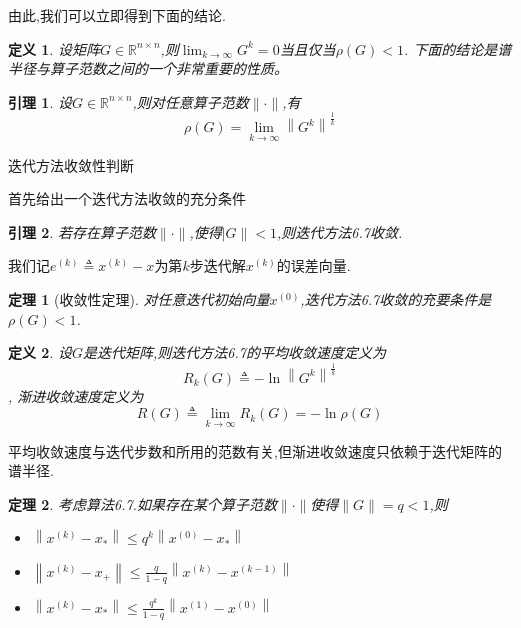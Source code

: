 \documentclass[notheorems,serif]{beamer}
\renewcommand{\normalsize}{\wuhao}
\newcommand{\wuhao}{\fontsize{10.5pt}{\baselineskip}\selectfont}
\newcommand{\hei}[1]{{\HEI#1}}
\newtheorem{theorem}{\hei{定理}}
\newtheorem{definition}{\hei{定义}}
\newtheorem{lemma}{\hei{引理}}
\begin{document}
\begin{frame}
由此,我们可以立即得到下面的结论.\\
\begin{definition}
设矩阵$G \in \mathbb{R}^{n \times n}$,则$\lim _{k \rightarrow \infty} G^{k}=0$当且仅当$\rho(G)<1$.
下面的结论是谱半径与算子范数之间的一个非常重要的性质。\\
\end{definition}

\begin{lemma}
设$G \in \mathbb{R}^{n \times n}$,则对任意算子范数$\|\cdot\|$,有
$$
\rho(G)=\lim _{k \rightarrow \infty}\left\|G^{k}\right\|^{\frac{1}{k}}
$$
\end{lemma}
\end{frame}

\begin{frame}

{\color{blue}\Large 迭代方法收敛性判断}

\quad

\normalsize
首先给出一个迭代方法收敛的充分条件\\
\begin{lemma}
若存在算子范数$\|\cdot\|$,使得$| G \|<1$,则迭代方法6.7收敛.\\
\end{lemma}
我们记$e^{(k)} \triangleq x^{(k)}-x$为第$k$步迭代解$x^{(k)}$的{\color{blue}误差向量}.\\
\begin{theorem}[收敛性定理]
对任意迭代初始向量$x^{(0)}$,迭代方法6.7收敛的充要条件是$\rho(G)<1$.\\
\end{theorem}

\end{frame}

\begin{frame}
\begin{definition}
设$G$是迭代矩阵,则迭代方法6.7的{\color{blue}平均收敛速度}定义为
$$
R_{k}(G) \triangleq-\ln \left\|G^{k}\right\|^{\frac{1}{k}}
$$,
{\color{blue}渐进收敛速度}定义为
$$
R(G) \triangleq \lim _{k \rightarrow \infty} R_{k}(G)=-\ln \rho(G)
$$
\end{definition}
平均收敛速度与迭代步数和所用的范数有关,但渐进收敛速度只依赖于迭代矩阵的谱半径.\\
\end{frame}

\begin{theorem}
考虑算法6.7.如果存在某个算子范数$\|\cdot\|$使得$\|G\|=q<1$,则
\begin{itemize}
\item[(1)]$\left\|x^{(k)}-x_{*}\right\| \leq q^{k}\left\|x^{(0)}-x_{*}\right\|$

\item[(2)]$\left\|x^{(k)}-x_{+}\right\| \leq \frac{q}{1-q}\left\|x^{(k)}-x^{(k-1)}\right\|$

\item[(3)]$\left\|x^{(k)}-x_{*}\right\| \leq \frac{q^{k}}{1-q}\left\|x^{(1)}-x^{(0)}\right\|$
\end{itemize}
\end{theorem}
\end{document}
